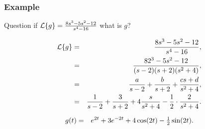 \begin{frame}
  \frametitle{Example}

  \begin{block}{Question}
    if $\laplace{g}=\frac{8s^3-5s^2-12}{s^4-16}$ what is $g$?
  \end{block}

    {
      \begin{eqnarray*}
        \laplace{g} & = & \frac{8s^3-5s^2-12}{s^4-16}, \\
        & = & \frac{82^3-5s^2-12}{(s-2)(s+2)(s^2+4)}, \\
        & = & \frac{a}{s-2} + \frac{b}{s+2} + \frac{cs+d}{s^2+4}, \\
        & = & \frac{1}{s-2} + \frac{3}{s+2} + 4 \frac{s}{s^2+4} - \frac{1}{2}\cdot\frac{2}{s^2+4}.
      \end{eqnarray*}
    }

    {
      \begin{eqnarray*}
        g(t) & = & e^{2t} + 3e^{-2t} + 4\cos(2t) - \mbox{$\frac{1}{2}$}\sin(2t).
      \end{eqnarray*}
    }
  

\end{frame}




